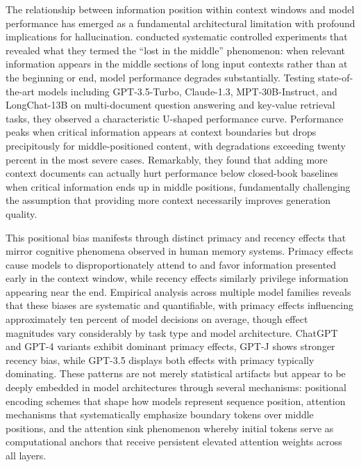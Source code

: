 \documentclass[11pt,letterpaper]{article}
\begin{document}
The relationship between information position within context windows and model performance has emerged as a fundamental architectural limitation with profound implications for hallucination. \cite{liu2024lost} conducted systematic controlled experiments that revealed what they termed the ``lost in the middle'' phenomenon: when relevant information appears in the middle sections of long input contexts rather than at the beginning or end, model performance degrades substantially. Testing state-of-the-art models including GPT-3.5-Turbo, Claude-1.3, MPT-30B-Instruct, and LongChat-13B on multi-document question answering and key-value retrieval tasks, they observed a characteristic U-shaped performance curve. Performance peaks when critical information appears at context boundaries but drops precipitously for middle-positioned content, with degradations exceeding twenty percent in the most severe cases. Remarkably, they found that adding more context documents can actually hurt performance below closed-book baselines when critical information ends up in middle positions, fundamentally challenging the assumption that providing more context necessarily improves generation quality.

This positional bias manifests through distinct primacy and recency effects that mirror cognitive phenomena observed in human memory systems. Primacy effects cause models to disproportionately attend to and favor information presented early in the context window, while recency effects similarly privilege information appearing near the end. Empirical analysis across multiple model families reveals that these biases are systematic and quantifiable, with primacy effects influencing approximately ten percent of model decisions on average, though effect magnitudes vary considerably by task type and model architecture. ChatGPT and GPT-4 variants exhibit dominant primacy effects, GPT-J shows stronger recency bias, while GPT-3.5 displays both effects with primacy typically dominating. These patterns are not merely statistical artifacts but appear to be deeply embedded in model architectures through several mechanisms: positional encoding schemes that shape how models represent sequence position, attention mechanisms that systematically emphasize boundary tokens over middle positions, and the attention sink phenomenon whereby initial tokens serve as computational anchors that receive persistent elevated attention weights across all layers.
\end{document}
